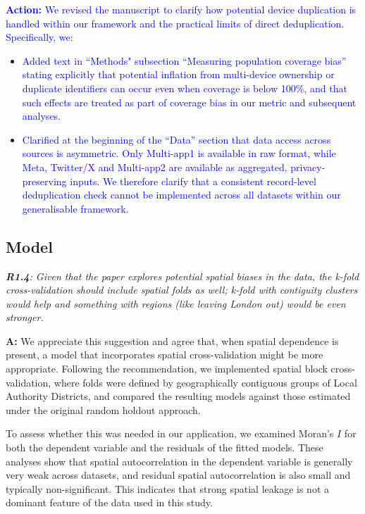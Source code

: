 \documentclass[
  letterpaper,
  DIV=11,
  numbers=noendperiod]{scrartcl}
\begin{document}
\setlength{\leftskip}{0.5cm}\textcolor{blue}{\textbf{Action:} We revised the manuscript to clarify how potential device duplication is handled within our framework and the practical limits of direct deduplication. Specifically, we:}

\begin{itemize}[noitemsep, topsep=0pt]\vspace{-3mm}

\item \textcolor{blue}{Added text in ``Methods" subsection ``Measuring population coverage bias'' stating explicitly that potential inflation from multi-device ownership or duplicate identifiers can occur even when coverage is below 100\%, and that such effects are treated as part of coverage bias in our metric and subsequent analyses.}
\item \textcolor{blue}{Clarified at the beginning of the ``Data'' section that data access across sources is asymmetric. Only Multi-app1 is available in raw format, while Meta, Twitter/X and Multi-app2 are available as aggregated, privacy-preserving inputs. We therefore clarify that a consistent record-level deduplication check cannot be implemented across all datasets within our generalisable framework.}
\end{itemize}

\subsection{Model}

\setlength{\leftskip}{0cm}\textit{\textbf{R1.4}: Given that the paper explores potential spatial biases in the data, the k-fold cross-validation should include spatial folds as well; k-fold with contiguity clusters would help and something with regions (like leaving London out) would be even stronger.}

\setlength{\leftskip}{0.5cm}\textbf{A:} We appreciate this suggestion
and agree that, when spatial dependence is present, a model that
incorporates spatial cross-validation might be more appropriate.
Following the recommendation, we implemented spatial block
cross-validation, where folds were defined by geographically contiguous
groups of Local Authority Districts, and compared the resulting models
against those estimated under the original random holdout approach.

To assess whether this was needed in our application, we examined
Moran's \(I\) for both the dependent variable and the residuals of the
fitted models. These analyses show that spatial autocorrelation in the
dependent variable is generally very weak across datasets, and residual
spatial autocorrelation is also small and typically non-significant.
This indicates that strong spatial leakage is not a dominant feature of
the data used in this study.
\end{document}
